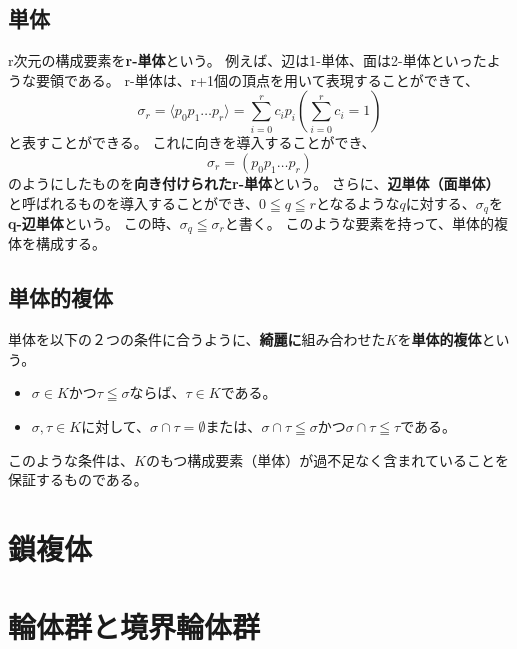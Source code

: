 \documentclass[a4paper]{jsreport}
\begin{document}
            \subsection*{単体}
                r次元の構成要素を\textbf{r-単体}という。
                例えば、辺は1-単体、面は2-単体といったような要領である。
                r-単体は、r+1個の頂点を用いて表現することができて、
                \begin{equation}
                    \sigma_r = \langle p_0p_1 \dots p_r \rangle = \sum_{i=0}^{r} c_i p_i \left( \sum_{i=0}^{r} c_i = 1 \right)
                \end{equation}
                と表すことができる。
                これに向きを導入することができ、
                \begin{equation}
                    \sigma_r = ( p_0p_1 \dots p_r )
                \end{equation}
                のようにしたものを\textbf{向き付けられたr-単体}という。
                さらに、\textbf{辺単体（面単体）}と呼ばれるものを導入することができ、$0 \leqq q \leqq r$となるような$q$に対する、$\sigma_q$を\textbf{q-辺単体}という。
                この時、$\sigma_q \leqq \sigma_r$と書く。
                このような要素を持って、単体的複体を構成する。

            \subsection*{単体的複体}
                単体を以下の２つの条件に合うように、\textbf{綺麗に}組み合わせた$K$を\textbf{単体的複体}という。
                \begin{itemize}
                  \item $\sigma \in K$かつ$\tau \leqq \sigma$ならば、$\tau \in K$である。
                  \item $\sigma, \tau \in K$に対して、$\sigma \cap \tau = \emptyset$または、$\sigma \cap \tau \leqq \sigma$かつ$\sigma \cap \tau \leqq \tau$である。
                \end{itemize}
                このような条件は、$K$のもつ構成要素（単体）が過不足なく含まれていることを保証するものである。

        \section{鎖複体}
            

        \section{輪体群と境界輪体群}
\end{document}
